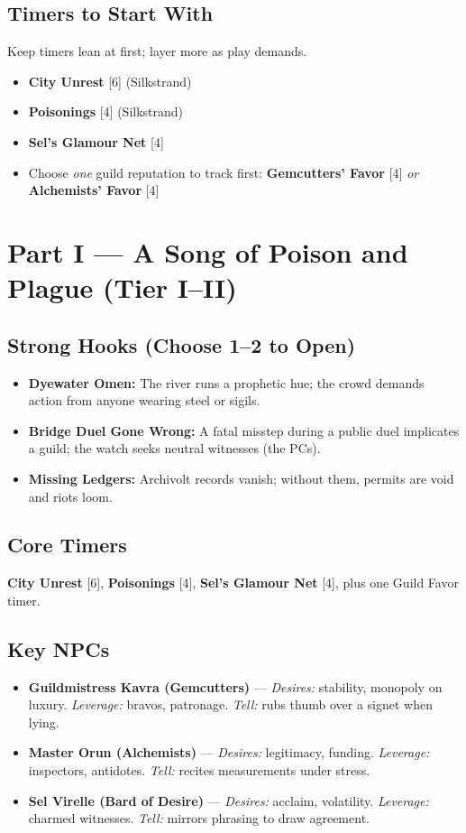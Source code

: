 \documentclass[11pt]{article}
\newcommand{\Clock}[2]{\textbf{#1} [#2]}
\begin{document}
\subsection*{Timers to Start With}
Keep timers lean at first; layer more as play demands.
\begin{itemize}
\item \Clock{City Unrest}{6} (Silkstrand)
\item \Clock{Poisonings}{4} (Silkstrand)
\item \Clock{Sel's Glamour Net}{4}
\item Choose \emph{one} guild reputation to track first: \Clock{Gemcutters' Favor}{4} \emph{or} \Clock{Alchemists' Favor}{4}
\end{itemize}

\section*{Part I --- A Song of Poison and Plague (Tier I--II)}

\subsection*{Strong Hooks (Choose 1--2 to Open)}
\begin{itemize}
\item \textbf{Dyewater Omen:} The river runs a prophetic hue; the crowd demands action from anyone wearing steel or sigils.
\item \textbf{Bridge Duel Gone Wrong:} A fatal misstep during a public duel implicates a guild; the watch seeks neutral witnesses (the PCs).
\item \textbf{Missing Ledgers:} Archivolt records vanish; without them, permits are void and riots loom.
\end{itemize}

\subsection*{Core Timers}
\Clock{City Unrest}{6}, \Clock{Poisonings}{4}, \Clock{Sel's Glamour Net}{4}, plus one Guild Favor timer.

\subsection*{Key NPCs}
\begin{itemize}
\item \textbf{Guildmistress Kavra (Gemcutters)} --- \emph{Desires:} stability, monopoly on luxury. \emph{Leverage:} bravos, patronage. \emph{Tell:} rubs thumb over a signet when lying.
\item \textbf{Master Orun (Alchemists)} --- \emph{Desires:} legitimacy, funding. \emph{Leverage:} inspectors, antidotes. \emph{Tell:} recites measurements under stress.
\item \textbf{Sel Virelle (Bard of Desire)} --- \emph{Desires:} acclaim, volatility. \emph{Leverage:} charmed witnesses. \emph{Tell:} mirrors phrasing to draw agreement.
\end{itemize}
\end{document}

